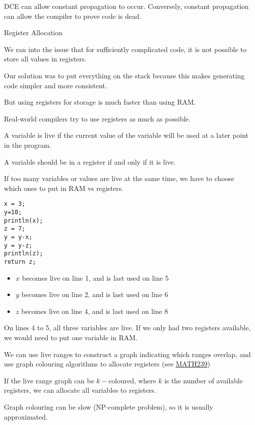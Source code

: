 \documentclass{article}
\begin{document}
DCE can allow constant propagation to occur. Conversely, constant
propagation can allow the compiler to prove code is dead.

Register Allocation

We ran into the issue that for sufficiently complicated code, it is not
possible to store all values in registers.

Our solution was to put everything on the stack because this makes
generating code simpler and more consistent.

But using registers for storage is much faster than using RAM.

Real-world compilers try to use registers as much as possible.

A variable is live if the current value of the variable will be used at
a later point in the program.

A variable should be in a register if and only if it is live.

If too many variables or values are live at the same time, we have to
choose which ones to put in RAM vs registers.

\begin{tcolorbox}
\begin{verbatim}
x = 3;
y=10;
println(x);
z = 7;
y = y-x;
y = y-z;
println(z);
return z;
\end{verbatim}
\end{tcolorbox}

\begin{itemize}
\item
  \(x\) becomes live on line 1, and is last used on line 5
\item
  \(y\) becomes live on line 2, and is last used on line 6
\item
  \(z\) becomes live on line 4, and is last used on line 8
\end{itemize}

On lines 4 to 5, all three variables are live. If we only had two
registers available, we would need to put one variable in RAM.

We can use live ranges to construct a graph indicating which ranges
overlap, and use graph colouring algorithms to allocate registers (see
\href{https://www.jaidenratti.com/MATH239.pdf}{MATH239})

If the live range graph can be \(k-\)coloured, where \(k\) is the number
of available registers, we can allocate all variables to registers.

Graph colouring can be slow (NP-complete problem), so it is usually
approximated.
\end{document}
